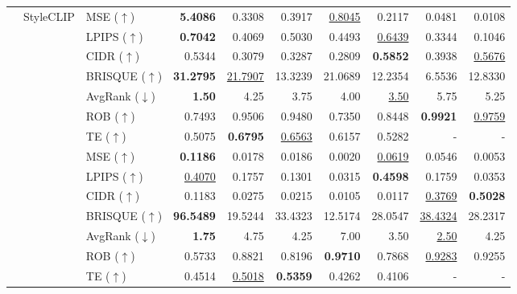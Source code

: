 \documentclass{article}
\begin{document}
\begin{table}[t!]
\begin{tabular}{lllrrrrrrr}
& \multirow{9}{*}{StyleCLIP}
& MSE ($\uparrow$) & \textbf{5.4086} & 0.3308 & 0.3917 & \underline{0.8045} & 0.2117 & 0.0481 & 0.0108 \\
& & LPIPS ($\uparrow$) & \textbf{0.7042} & 0.4069 & 0.5030 & 0.4493 & \underline{0.6439} & 0.3344 & 0.1046 \\
& & CIDR ($\uparrow$) & 0.5344 & 0.3079 & 0.3287 & 0.2809 & \textbf{0.5852} & 0.3938 & \underline{0.5676} \\
& & BRISQUE ($\uparrow$) & \textbf{31.2795} & \underline{21.7907} & 13.3239 & 21.0689 & 12.2354 & 6.5536 & 12.8330 \\
\cmidrule(lr){3-10}
& & AvgRank ($\downarrow$) & \textbf{1.50} & 4.25 & 3.75 & 4.00 & \underline{3.50} & 5.75 & 5.25 \\
\cmidrule(lr){3-10}
& & ROB ($\uparrow$) & 0.7493 & 0.9506 & 0.9480 & 0.7350 & 0.8448 & \textbf{0.9921} & \underline{0.9759} \\
& & TE ($\uparrow$) & 0.5075 & \textbf{0.6795} & \underline{0.6563} & 0.6157 & 0.5282 & - & - \\
\cmidrule(lr){2-10}

& \multirow{9}{*}{DiffAE}
& MSE ($\uparrow$) & \textbf{0.1186} & 0.0178 & 0.0186 & 0.0020 & \underline{0.0619} & 0.0546 & 0.0053 \\
& & LPIPS ($\uparrow$) & \underline{0.4070} & 0.1757 & 0.1301 & 0.0315 & \textbf{0.4598} & 0.1759 & 0.0353 \\
& & CIDR ($\uparrow$) & 0.1183 & 0.0275 & 0.0215 & 0.0105 & 0.0117 & \underline{0.3769} & \textbf{0.5028} \\
& & BRISQUE ($\uparrow$) & \textbf{96.5489} & 19.5244 & 33.4323 & 12.5174 & 28.0547 & \underline{38.4324} & 28.2317 \\
\cmidrule(lr){3-10}
& & AvgRank ($\downarrow$) & \textbf{1.75} & 4.75 & 4.25 & 7.00 & 3.50 & \underline{2.50} & 4.25 \\
\cmidrule(lr){3-10}
& & ROB ($\uparrow$) & 0.5733 & 0.8821 & 0.8196 & \textbf{0.9710} & 0.7868 & \underline{0.9283} & 0.9255\\
& & TE ($\uparrow$) & 0.4514 & \underline{0.5018} & \textbf{0.5359} & 0.4262 & 0.4106 & - & - \\

\midrule


\end{tabular}
\end{table}
\end{document}
